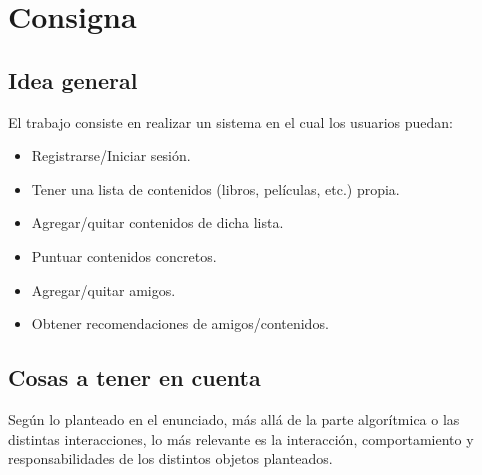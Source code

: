 \section{Consigna}\label{sec:consigna}
\subsection{Idea general}\label{subsec:idea-general}
El trabajo consiste en realizar un sistema en el cual los usuarios puedan:
\begin{itemize}
    \item Registrarse/Iniciar sesión.
    \item Tener una lista de contenidos (libros, películas, etc.) propia.
    \item Agregar/quitar contenidos de dicha lista.
    \item Puntuar contenidos concretos.
    \item Agregar/quitar amigos.
    \item Obtener recomendaciones de amigos/contenidos.
\end{itemize}

\subsection{Cosas a tener en cuenta}\label{subsec:cosas-a-tener-en-cuenta}
Según lo planteado en el enunciado, más allá de la parte algorítmica o las distintas interacciones, lo más relevante es 
la interacción, comportamiento y responsabilidades de los distintos objetos planteados.